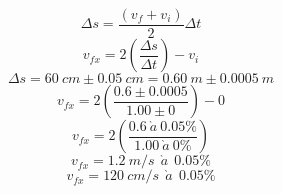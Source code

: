\documentclass{article}
\begin{document}
                \setcounter{equation}{0}
                \vspace{5mm}
                \begin{equation}
                    \Delta s = \frac{(v_f+v_i)}{2}  \Delta t
                \end{equation}
                \vspace{5mm}
                \begin{equation}
                    v_{fx} = 2 \left( \frac{\Delta s}{\Delta t} \right) - v_i
                \end{equation}
                 \vspace{5mm}
                \begin{equation}
                    \Delta s = 60 \ cm \pm 0.05 \ cm = 0.60 \ m \pm 0.0005 \ m
                \end{equation}
                \vspace{5mm}
                \begin{equation}
                    v_{fx} = 2 \left( \frac{0.6 \pm 0.0005}{1.00 \pm 0} \right) - 0
                \end{equation}
                \vspace{5mm}
                \begin{equation}
                    v_{fx} = 2 \left( \frac{0.6 \ \grave{a} \ 0.05 \% }{1.00 \ \grave{a} \ 0\% } \right)
                \end{equation}
                \vspace{5mm}
                \begin{equation}
                    v_{fx} = 1.2 \ m/s \ \ \grave{a} \ \ 0.05 \%
                \end{equation}
                \vspace{5mm}
                \begin{equation}
                    v_{fx} = 120 \ cm/s  \ \ \grave{a} \ \ 0.05 \%
                \end{equation}
                \vspace{10mm}
\end{document}
